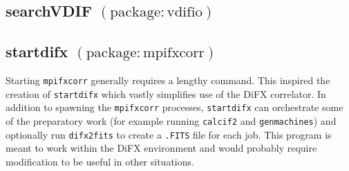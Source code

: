 




\subsection{searchVDIF {\small $\mathrm{(package: vdifio)}$}} \label{sec:searchVDIF}





\subsection{startdifx {\small $\mathrm{(package: mpifxcorr)}$}} \label{sec:startdifx} 

Starting {\tt mpifxcorr} generally requires a lengthy command.
This inspired the creation of {\tt startdifx} which vastly simplifies use of the DiFX correlator.
In addition to spawning the {\tt mpifxcorr} processes, {\tt startdifx} can orchestrate some of the preparatory work (for example running {\tt calcif2} and {\tt genmachines}) and optionally run {\tt difx2fits} to create a {\tt .FITS} file for each job.
This program is meant to work within the DiFX environment and would probably require modification to be useful in other situations.

